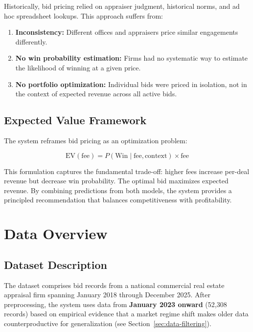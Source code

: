 \documentclass[12pt,a4paper]{article}
\begin{document}
Historically, bid pricing relied on appraiser judgment, historical norms, and ad hoc spreadsheet lookups. This approach suffers from:
\begin{enumerate}[nosep]
    \item \textbf{Inconsistency:} Different offices and appraisers price similar engagements differently.
    \item \textbf{No win probability estimation:} Firms had no systematic way to estimate the likelihood of winning at a given price.
    \item \textbf{No portfolio optimization:} Individual bids were priced in isolation, not in the context of expected revenue across all active bids.
\end{enumerate}

\subsection{Expected Value Framework}

The system reframes bid pricing as an optimization problem:

\begin{equation}
    \text{EV}(\text{fee}) = P(\text{Win} \mid \text{fee}, \text{context}) \times \text{fee}
\end{equation}

This formulation captures the fundamental trade-off: higher fees increase per-deal revenue but decrease win probability. The optimal bid maximizes expected revenue. By combining predictions from both models, the system provides a principled recommendation that balances competitiveness with profitability.

\section{Data Overview}

\subsection{Dataset Description}

The dataset comprises bid records from a national commercial real estate appraisal firm spanning January 2018 through December 2025. After preprocessing, the system uses data from \textbf{January 2023 onward} (52,308 records) based on empirical evidence that a market regime shift makes older data counterproductive for generalization (see Section~\ref{sec:data-filtering}).
\end{document}
